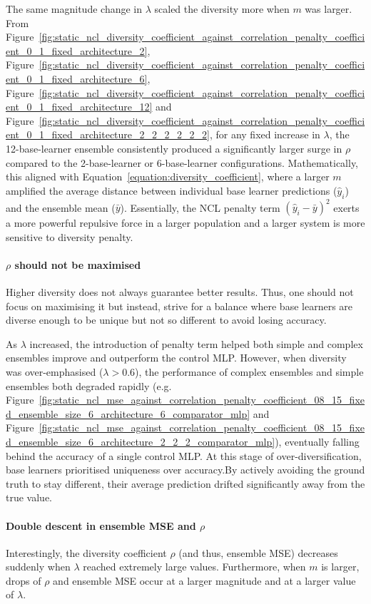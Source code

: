 The same magnitude change in $\lambda$ scaled the diversity more when $m$ was larger. From Figure~\ref{fig:static_ncl_diversity_coefficient_against_correlation_penalty_coefficient_0_1_fixed_architecture_2}, Figure~\ref{fig:static_ncl_diversity_coefficient_against_correlation_penalty_coefficient_0_1_fixed_architecture_6}, Figure~\ref{fig:static_ncl_diversity_coefficient_against_correlation_penalty_coefficient_0_1_fixed_architecture_12} and Figure~\ref{fig:static_ncl_diversity_coefficient_against_correlation_penalty_coefficient_0_1_fixed_architecture_2_2_2_2_2_2}, for any fixed increase in $\lambda$, the 12-base-learner ensemble consistently produced a significantly larger surge in $\rho$ compared to the 2-base-learner or 6-base-learner configurations. Mathematically, this aligned with Equation~\ref{equation:diversity_coefficient}, where a larger $m$ amplified the average distance between individual base learner predictions ($\hat{y}_i$) and the ensemble mean ($\bar{y}$). Essentially, the NCL penalty term $(\hat{y}_i - \bar{y})^2$ exerts a more powerful repulsive force in a larger population and a larger system is more sensitive to diversity penalty. 

\paragraph{$\rho$ should not be maximised}
Higher diversity does not always guarantee better results. Thus, one should not focus on maximising it but instead, strive for a balance where base learners are diverse enough to be unique but not so different to avoid losing accuracy. 

As $\lambda$ increased, the introduction of penalty term helped both simple and complex ensembles improve and outperform the control MLP. However, when diversity was over-emphasised ($\lambda > 0.6$), the performance of complex ensembles and simple ensembles both degraded rapidly (e.g. Figure~\ref{fig:static_ncl_mse_against_correlation_penalty_coefficient_08_15_fixed_ensemble_size_6_architecture_6_comparator_mlp} and Figure~\ref{fig:static_ncl_mse_against_correlation_penalty_coefficient_08_15_fixed_ensemble_size_6_architecture_2_2_2_comparator_mlp}), eventually falling behind the accuracy of a single control MLP. At this stage of over-diversification, base learners prioritised uniqueness over accuracy.By actively avoiding the ground truth to stay different, their average prediction drifted significantly away from the true value. 

\paragraph{Double descent in ensemble MSE and $\rho$}
Interestingly, the diversity coefficient $\rho$ (and thus, ensemble MSE) decreases suddenly when $\lambda$ reached extremely large values. Furthermore, when $m$ is larger, drops of $\rho$ and ensemble MSE occur at a larger magnitude and at a larger value of $\lambda$. 

